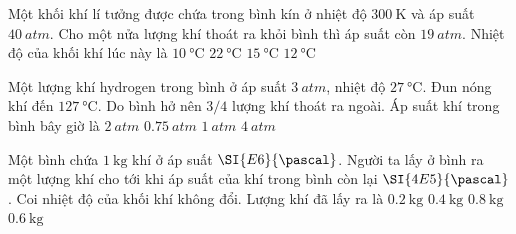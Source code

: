 \begin{ex}
Một khối khí lí tưởng được chứa trong bình kín ở nhiệt độ $\SI{300}{\kelvin}$ và áp suất $\SI{40}{atm}$. Cho một nửa lượng khí thoát ra khỏi bình thì áp suất còn $\SI{19}{atm}$. Nhiệt độ của khối khí lúc này là	
	\choice
	{$\SI{10}{\celsius}$}
	{$\SI{22}{\celsius}$}
	{$\SI{15}{\celsius}$}
	{\True $\SI{12}{\celsius}$}
\end{ex}
\begin{ex}
Một lượng khí hydrogen trong bình ở áp suất $\SI{3}{atm}$, nhiệt độ $\SI{27}{\celsius}$. Đun nóng khí đến $\SI{127}{\celsius}$. Do bình hở nên $3/4$ lượng khí thoát ra ngoài. Áp suất khí trong bình bây giờ là	
	\choice
	{$\SI{2}{atm}$}
	{$\SI{0.75}{atm}$}
	{\True $\SI{1}{atm}$}
	{$\SI{4}{atm}$}
\end{ex}
\begin{ex}
	Một bình chứa $\SI{1}{\kilogram}$ khí ở áp suất $\SI{E6}{\pascal}$. Người ta lấy ở bình ra một lượng khí cho tới khi áp suất của khí trong bình còn lại $\SI{4E5}{\pascal}$. Coi nhiệt độ của khối khí không đổi. Lượng khí đã lấy ra là
	\choice
	{$\SI{0.2}{\kilogram}$}
	{$\SI{0.4}{\kilogram}$}
	{$\SI{0.8}{\kilogram}$}
	{\True $\SI{0.6}{\kilogram}$}
\end{ex}
